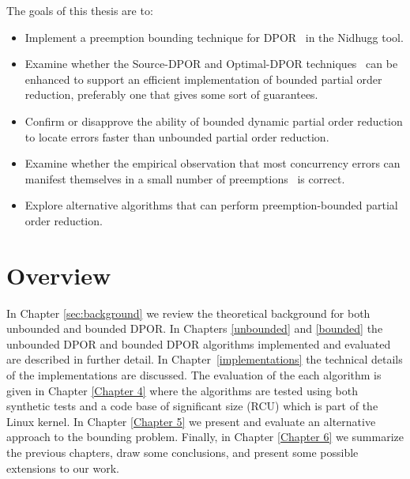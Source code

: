 The goals of this thesis are to: 
\begin{itemize}
\item Implement a preemption bounding technique for DPOR~\cite{BPOR} in the Nidhugg tool. 
\item Examine whether the Source-DPOR and Optimal-DPOR techniques~\cite{AbdullaAronisJohnssonSagonasDPOR2014} can
  be enhanced to support an efficient implementation of bounded partial order reduction,
  preferably one that gives some sort of guarantees.
\item Confirm or disapprove the ability of bounded dynamic partial order reduction to locate errors faster than unbounded partial order reduction.
\item Examine whether the empirical observation that most concurrency errors can manifest themselves in a small number of preemptions~\cite{Musu07} is correct.
\item Explore alternative algorithms that can perform preemption-bounded partial order reduction.
\end{itemize}

\iffalse
The purpose of this thesis is the implementation of a preemption bounding technique \cite{BPOR} for Nidhugg and the combination
of this technique with the a novel technique \cite{AbdullaAronisJohnssonSagonasDPOR2014} suggested for better coverage of the state space.
The bounded-DPOR was used to verify the linux kernel \cite{LinuxKernel} and specifically RCU \cite{Spin}. RCU is a synchronization
mechanism used heavily in Linux kernel, and many of the kernel’s subsystems rely on RCU’s correct operation. By using BPOR the minimum preemptive
switches required to track failure injections were counted. As a result the empirical observation that errors occur in a small bound count was confirmed.
Moreover, the possible application of various optimizations used for unbounded DPOR on bounded DPOR are examined. 
\fi

\section{Overview}
In Chapter \ref{sec:background} we review the theoretical background for both unbounded and bounded DPOR.
In Chapters \ref{unbounded} and \ref{bounded} the unbounded DPOR and bounded DPOR algorithms implemented and evaluated are
described in further detail. In Chapter~\ref{implementations} the technical details of the implementations are
discussed. The evaluation of the each algorithm is given in Chapter \ref{Chapter 4} where the algorithms are tested
using both synthetic tests and a code base of significant size (RCU) which is part of the Linux kernel. In Chapter \ref{Chapter 5} we present and evaluate an
alternative approach to the bounding problem.
Finally, in Chapter \ref{Chapter 6} we summarize the previous chapters, draw some conclusions, and present some possible extensions to our work.
